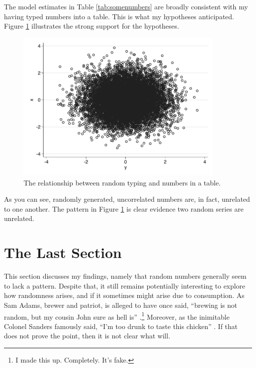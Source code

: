 \documentclass[12pt]{article}
\begin{document}
The model estimates in Table \ref{tab:somenumbers} are broadly consistent with my having typed numbers into a table. This is what my hypotheses anticipated. Figure \ref{fig:apicture} illustrates the strong support for the hypotheses.

\begin{figure}[h!]
\begin{centering}
\includegraphics[width=4in]{somenumbers.pdf} 
\caption{The relationship between random typing and numbers in a table.}  \label{fig:apicture}
\end{centering}
\end{figure}


As you can see, randomly generated, uncorrelated numbers are, in fact, unrelated to one another. The pattern in Figure \ref{fig:apicture} is clear evidence two random series are unrelated.

\section*{The Last Section}
 
 This section discusses my findings, namely that random numbers generally seem to lack a pattern. Despite that, it still remains potentially interesting to explore how randomness arises, and if it sometimes might arise due to consumption. As Sam Adams, brewer and patriot, is alleged to have once said, ``brewing is not random, but my cousin John sure as hell is'' \cite{adams1766brewing}.\footnote{I made this up. Completely. It's fake.} Moreover, as the inimitable Colonel Sanders famously said, ``I'm too drunk to taste this chicken'' \cite{ferrell2006talladega}. If that does not prove the point, then it is not clear what will. 
 
 
\clearpage
\pagebreak
\doublespace


\end{document}
